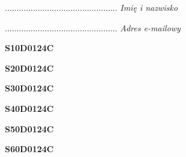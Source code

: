 \begin{turn}{90}\begin{minipage}{\linewidth} \vspace{20mm} ................................................  \textit{Imię i nazwisko}\end{minipage}\end{turn}

\begin{turn}{90}\begin{minipage}{\linewidth} \vspace{20mm} ................................................  \textit{Adres e-mailowy}\end{minipage}\end{turn}

\begin{turn}{90}\huge \begin{minipage}{\linewidth} \vspace{10mm}\textbf{S10D0124C}\end{minipage}\end{turn}

\begin{turn}{90}\huge \begin{minipage}{\linewidth} \vspace{10mm}\textbf{S20D0124C}\end{minipage}\end{turn}

\begin{turn}{90}\huge \begin{minipage}{\linewidth} \vspace{10mm}\textbf{S30D0124C}\end{minipage}\end{turn}

\begin{turn}{90}\huge \begin{minipage}{\linewidth} \vspace{10mm}\textbf{S40D0124C}\end{minipage}\end{turn}

\begin{turn}{90}\huge \begin{minipage}{\linewidth} \vspace{10mm}\textbf{S50D0124C}\end{minipage}\end{turn}

\begin{turn}{90}\huge \begin{minipage}{\linewidth} \vspace{10mm}\textbf{S60D0124C}\end{minipage}\end{turn}

